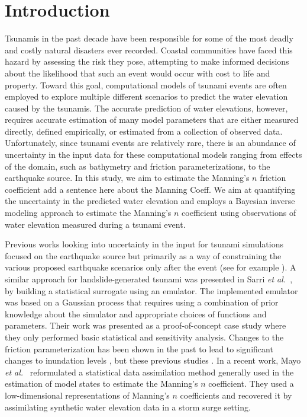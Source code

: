 
\section{Introduction}
\label{sec:intro}
Tsunamis in the past decade have been responsible for some of the most  deadly
and costly natural disasters ever recorded. Coastal communities  have faced this
hazard by assessing the risk they pose, attempting  to make informed decisions
about the likelihood that such an event would  occur with cost to life and
property.  Toward this goal, computational models of  tsunami events are often
employed to explore multiple different scenarios to predict the water elevation
caused by the tsunamis. The accurate prediction  of water elevations, however, requires
accurate estimation of many model parameters that are either measured directly,
defined empirically, or estimated from a collection of observed data. Unfortunately,
since tsunami events are relatively rare,  there is an abundance of uncertainty
in the input data for these computational  models ranging from effects of the
domain, such as bathymetry and friction parameterizations,  to the earthquake
source.  In this study, we aim to estimate the Manning's $n$ friction
coefficient \alert{add a sentence here about the Manning Coeff}. 
We aim at quantifying the uncertainty in the predicted water
elevation  and employs a Bayesian inverse modeling approach to estimate the Manning's
$n$ coefficient using observations of water elevation measured during a tsunami event.

Previous works looking into uncertainty in the input for tsunami simulations
focused on the earthquake source but primarily as a way of
constraining the various proposed earthquake scenarios only after the event (see
for example \cite{MacInnes:2013cr}).  A similar approach for landslide-generated
tsunami was presented in Sarri \emph{et al.}~\cite{Sarri2012}, by building a statistical surrogate
using an emulator. The implemented emulator was based on a Gaussian
process that requires using a combination of prior knowledge about the simulator
and appropriate choices of functions and parameters. Their work was presented as
a proof-of-concept case study where they only performed basic statistical and
sensitivity analysis.  Changes to the friction parameterization has been shown in 
the past to lead to significant changes to inundation levels \cite{Myers:2001el,Jakeman:2010hk}, 
but these previous studies .  
In a recent work, Mayo \emph{et al.}~\cite{Mayo2013} reformulated a statistical data assimilation method
generally used in the estimation of model states to estimate the Manning's $n$
coefficient. They used a low-dimensional representations of
Manning's $n$ coefficients and recovered it by assimilating synthetic water elevation data
in a storm surge setting.


